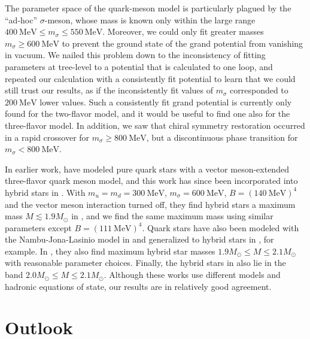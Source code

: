 The parameter space of the quark-meson model is particularly plagued by the ``ad-hoc'' $\sigma$-meson,
whose mass is known only within the large range $\SI{400}{\mega\electronvolt} \leq m_\sigma \leq \SI{550}{\mega\electronvolt}$.
Moreover, we could only fit greater masses $m_\sigma \geq \SI{600}{\mega\electronvolt}$ to prevent the ground state of the grand potential from vanishing in vacuum.
We nailed this problem down to the inconsistency of fitting parameters at tree-level to a potential that is calculated to one loop,
and repeated our calculation with a consistently fit potential to learn that we could still trust our results,
as if the inconsistently fit values of $m_\sigma$ corresponded to $\SI{200}{\mega\electronvolt}$ lower values.
Such a consistently fit grand potential is currently only found for the two-flavor model, and it would be useful to find one also for the three-flavor model.
In addition, we saw that chiral symmetry restoration occurred in a rapid crossover for $m_\sigma \geq \SI{800}{\mega\electronvolt}$,
but a discontinuous phase transition for $m_\sigma < \SI{800}{\mega\electronvolt}$.

In earlier work, \cite{ref:lsm3f_compact_stars} have modeled pure quark stars with a vector meson-extended three-flavor quark meson model,
and this work has since been incorporated into hybrid stars in \cite{ref:lsm3f_hybrid_stars}.
With $m_u = m_d = \SI{300}{\mega\electronvolt}$, $m_\sigma = \SI{600}{\mega\electronvolt}$, $B = (\SI{140}{\mega\electronvolt})^4$ and the vector meson interaction turned off,
they find hybrid stars a maximum mass $M \lesssim 1.9 M_\odot$ in \cite[figure 8]{ref:lsm3f_hybrid_stars}, %
and we find the same maximum mass using similar parameters except $B = (\SI{111}{\mega\electronvolt})^4$.
Quark stars have also been modeled with the Nambu-Jona-Lasinio model in \cite{ref:quark_star_njl} and generalized to hybrid stars in \cite{ref:hybrid_stars_njl}, for example.
In \cite[figure 3]{ref:hybrid_stars_njl}, they also find maximum hybrid star masses $1.9 M_\odot \leq M \leq 2.1 M_\odot$ with reasonable parameter choices.
Finally, the hybrid stars in \cite{ref:quark_hybrid_additional_ref} also lie in the band $2.0 M_\odot \leq M \leq 2.1 M_\odot$.
Although these works use different models and hadronic equations of state,
our results are in relatively good agreement.

\section{Outlook}

